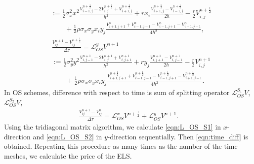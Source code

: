 \documentclass[11pt,reqno]{article}
\numberwithin{equation}{section}
\begin{document}
{\begin{equation}
\begin{aligned}
    &:= \frac{1}{2} \sigma_x^2 x^2
    \frac{V_{i-1, j}^{n + \frac{1}{2}} - 2V_{i, j}^{n + \frac{1}{2}} + V_{i+1, j}^{n+\frac{1}{2}}}{h^2}
    + r x_i \frac{V_{i+1, j}^{n + \frac{1}{2}} - V_{i-1, j}^{n + \frac{1}{2}}}{2h}
    - \frac{r}{2} V_{i, j}^{n + \frac{1}{2}} \\
    &\qquad+ \frac{1}{2} \rho \sigma_x \sigma_y x_i y_j
    \frac{V_{i+1, j+1}^{n} + V_{i-1, j-1}^{n} - V_{i-1, j+1}^{n} - V_{i+1, j-1}^{n}}{4h^2},
\end{aligned}
\end{equation} 
\begin{equation}\label{eqn:L_OS_S2}
\begin{aligned}
    &\frac{V_{ij}^{n + 1} - V_{ij}^{n + \frac{1}{2}}}{\Delta \tau}
    = \mathcal{L}_{OS}^{y}V^{n + 1} \\
    &:= \frac{1}{2} \sigma_y^2 y^2
    \frac{V_{i, j-1}^{n + 1} - 2V_{i, j}^{n + 1} + V_{i, j+1}^{n + 1}}{h^2}
    + r y_j \frac{V_{i, j+1}^{n + 1} - V_{i, j-1}^{n + 1}}{2h}
    - \frac{r}{2} V_{i, j}^{n + 1} \\
    &\qquad+ \frac{1}{2} \rho \sigma_x \sigma_y x_i y_j
    \frac{V_{i+1, j+1}^{n + \frac{1}{2}} + V_{i-1, j-1}^{n + \frac{1}{2}}
     - V_{i-1, j+1}^{n + \frac{1}{2}} - V_{i+1, j-1}^{n + \frac{1}{2}}}{4h^2}.
\end{aligned}
\end{equation} 
In OS schemes, difference with respect to time is sum of splitting operator $\mathcal{L}_{OS}^{S_1}V$, $\mathcal{L}_{OS}^{S_2}V$,
\begin{equation}\label{eqn:time_diff}
\begin{aligned}
    \frac{V_{ij}^{n + 1} - V_{ij}^{n}}{\Delta \tau}
    = \mathcal{L}_{OS}^{x}V^{n + \frac{1}{2}}
    + \mathcal{L}_{OS}^{y}V^{n + 1}.
\end{aligned}
\end{equation}
Using the tridiagonal matrix algorithm, we calculate \eqref{eqn:L_OS_S1} in $x$-direction and \eqref{eqn:L_OS_S2} in $y$-direction sequentially. Then \eqref{eqn:time_diff} is obtained. Repeating this procedure as many times as the number of the time meshes, we calculate the price of the ELS. 

}
\end{document}
